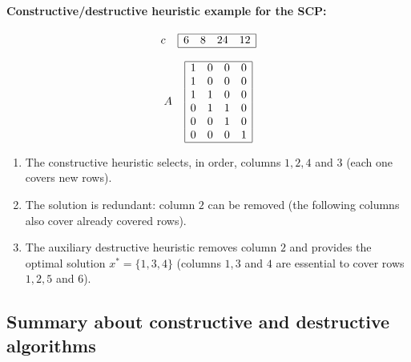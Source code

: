 \documentclass[11pt]{article}
\begin{document}
	\newpage
	
	\paragraph{Constructive/destructive heuristic example for the SCP:}
	$$
	c \;\;\;\; 
	\begin{array}{| c c c c |}
		\hline
		6 & 8 & 24 & 12 \\
		\hline
	\end{array}
	$$
	
	$$
	A \;\;\;\;
	\begin{array}{| c c c c |}
		\hline 
		1 & 0 & 0 & 0 \\
		1 & 0 & 0 & 0 \\
		1 & 1 & 0 & 0 \\
		0 & 1 & 1 & 0 \\
		0 & 0 & 1 & 0 \\
		0 & 0 & 0 & 1 \\
		\hline 
	\end{array}
	$$
	
	\begin{enumerate}
		\item The constructive heuristic selects, in order, columns $1, 2, 4$ and $3$ (each one covers new rows).\\
		
		\item The solution is redundant: column $2$ can be removed (the following columns also cover already covered rows).\\
		
		\item The auxiliary destructive heuristic removes column $2$ and provides the optimal solution $x^\ast = \{1, 3, 4\}$ (columns $1, 3$ and $4$ are essential to cover rows $1, 2, 5$ and $6$).\\
	\end{enumerate}
	
	\newpage
	
	\subsection*{Summary about constructive and destructive algorithms}
	
\end{document}
